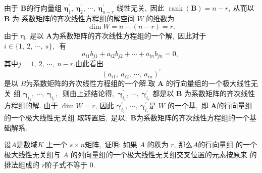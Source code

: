 \begin{solution}
	由于 $ \boldsymbol{B}  $的行向量组 $ \boldsymbol{\eta}_{1}^{\prime},\  \boldsymbol{\eta}_{2}^{\prime},\  \cdots,\  \boldsymbol{\eta}_{n-r}^{\prime}$  线性无关,\  因此  $\operatorname{rank}(\boldsymbol{B})=n-r ,\  $从而以$  \boldsymbol{B}$  为 系数矩阵的齐次线性方程组的解空间 $ W $ 的维数为
	$$\operatorname{dim} W=n-(n-r)=r.$$
	由于  $\boldsymbol{\eta} ,\  $是以  $\boldsymbol{A}  $为系数矩阵的齐次线性方程组的一个解,\  因此对于 $ i \in\{1,\ 2,\  \cdots,\  s\} ,\ $ 有
	$$a_{i 1} b_{j 1}+a_{i 2} b_{j 2}+\cdots+a_{i n} b_{j n}=0,\ $$
	其中$ j=1,\ 2,\  \cdots,\  n-r.$由此看出
	$$\left(a_{i 1},\  a_{i 2},\  \cdots,\  a_{i n}\right)^{\prime}$$
	是以  $B  $为系数矩阵的齐次线性方程组的一个解.取 $  \boldsymbol{A} $ 的行向量组的一个极大线性无关 组  $\boldsymbol{\gamma}_{i_{1}},\  \cdots,\  \boldsymbol{\gamma}_{i_{r}} ,\ $ 则由上述结论得,\   $\boldsymbol{\gamma}_{i_{1}}^{\prime},\  \cdots,\  \boldsymbol{\gamma}_{i_{r}}^{\prime} $ 都是以 $ \boldsymbol{B} $ 为系数矩阵的齐次线性方程组的解. 由于  $\operatorname{dim} W=r ,\  $因此  $\boldsymbol{\gamma}_{i_{1}}^{\prime},\  \cdots,\  \boldsymbol{\gamma}_{i_{r}}^{\prime}  $是  $W$  的一个基,\ 即 $ \boldsymbol{A}  $的行向量组的一个极大线性无关组 取转置后,\  是以,\  $ \boldsymbol{B}  $为系数矩阵的齐次线性方程组的一个基础解系.
\end{solution}
\newpage
\begin{problem}
	设$  A  $是数域$  K $ 上一个 $ s \times n  $矩阵,\ 证明: 如果 $ A $ 的秩为  $r ,\  $那么$  A  $的行向量组 的一个极大线性无关组与 $ A $ 的列向量组的一个极大线性无关组交叉位置的元素按原来 的排法组成的 $ r  $阶子式不等于 $0.$
\end{problem}
